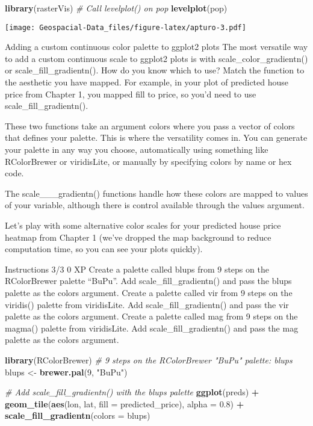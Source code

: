 \documentclass[]{article}
\newenvironment{Shaded}{\begin{snugshade}}{\end{snugshade}}
\newcommand{\CommentTok}[1]{\textcolor[rgb]{0.56,0.35,0.01}{\textit{#1}}}
\newcommand{\DataTypeTok}[1]{\textcolor[rgb]{0.13,0.29,0.53}{#1}}
\newcommand{\DecValTok}[1]{\textcolor[rgb]{0.00,0.00,0.81}{#1}}
\newcommand{\FloatTok}[1]{\textcolor[rgb]{0.00,0.00,0.81}{#1}}
\newcommand{\KeywordTok}[1]{\textcolor[rgb]{0.13,0.29,0.53}{\textbf{#1}}}
\newcommand{\NormalTok}[1]{#1}
\newcommand{\OperatorTok}[1]{\textcolor[rgb]{0.81,0.36,0.00}{\textbf{#1}}}
\newcommand{\StringTok}[1]{\textcolor[rgb]{0.31,0.60,0.02}{#1}}
\begin{document}
\begin{Shaded}
\begin{Highlighting}[]
\KeywordTok{library}\NormalTok{(rasterVis)}
\CommentTok{# Call levelplot() on pop}
\KeywordTok{levelplot}\NormalTok{(pop)}
\end{Highlighting}
\end{Shaded}

\texttt{[image: Geospacial-Data\_files/figure-latex/apturo-3.pdf]}

Adding a custom continuous color palette to ggplot2 plots The most
versatile way to add a custom continuous scale to ggplot2 plots is with
scale\_color\_gradientn() or scale\_fill\_gradientn(). How do you know
which to use? Match the function to the aesthetic you have mapped. For
example, in your plot of predicted house price from Chapter 1, you
mapped fill to price, so you'd need to use scale\_fill\_gradientn().

These two functions take an argument colors where you pass a vector of
colors that defines your palette. This is where the versatility comes
in. You can generate your palette in any way you choose, automatically
using something like RColorBrewer or viridisLite, or manually by
specifying colors by name or hex code.

The scale\_\_\_gradientn() functions handle how these colors are mapped
to values of your variable, although there is control available through
the values argument.

Let's play with some alternative color scales for your predicted house
price heatmap from Chapter 1 (we've dropped the map background to reduce
computation time, so you can see your plots quickly).

Instructions 3/3 0 XP Create a palette called blups from 9 steps on the
RColorBrewer palette ``BuPu''. Add scale\_fill\_gradientn() and pass the
blups palette as the colors argument. Create a palette called vir from 9
steps on the viridis() palette from viridisLite. Add
scale\_fill\_gradientn() and pass the vir palette as the colors
argument. Create a palette called mag from 9 steps on the magma()
palette from viridisLite. Add scale\_fill\_gradientn() and pass the mag
palette as the colors argument.

\begin{Shaded}
\begin{Highlighting}[]
\KeywordTok{library}\NormalTok{(RColorBrewer)}
\CommentTok{# 9 steps on the RColorBrewer "BuPu" palette: blups}
\NormalTok{blups <-}\StringTok{ }\KeywordTok{brewer.pal}\NormalTok{(}\DecValTok{9}\NormalTok{, }\StringTok{"BuPu"}\NormalTok{)}

\CommentTok{# Add scale_fill_gradientn() with the blups palette}
\KeywordTok{ggplot}\NormalTok{(preds) }\OperatorTok{+}
\StringTok{  }\KeywordTok{geom_tile}\NormalTok{(}\KeywordTok{aes}\NormalTok{(lon, lat, }\DataTypeTok{fill =}\NormalTok{ predicted_price), }\DataTypeTok{alpha =} \FloatTok{0.8}\NormalTok{) }\OperatorTok{+}
\StringTok{  }\KeywordTok{scale_fill_gradientn}\NormalTok{(}\DataTypeTok{colors =}\NormalTok{ blups)}
\end{Highlighting}
\end{Shaded}
\end{document}
